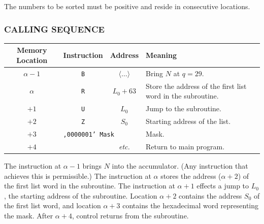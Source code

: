 The numbers to be sorted must be positive and reside in consecutive locations.

\subsubsection*{CALLING SEQUENCE}
\begin{table}[h!]
\centering
\begin{tabularx}{\textwidth}{cccX}
\toprule
\textbf{Memory Location} & \textbf{Instruction} & \textbf{Address} & \textbf{Meaning} \\
\midrule
$\alpha - 1$ & \texttt{B} & $\langle \dots \rangle$ & Bring $N$ at $q=29$. \\
$\alpha$     & \texttt{R} & $L_0 + 63$              & Store the address of the first list word in the subroutine. \\
$+1$         & \texttt{U} & $L_0$                   & Jump to the subroutine. \\
$+2$         & \texttt{Z} & $S_0$                   & Starting address of the list. \\
$+3$         & \multicolumn{2}{l}{\texttt{,0000001' Mask}} & Mask. \\
$+4$         &            & \textit{etc.}           & Return to main program. \\
\bottomrule
\end{tabularx}
\end{table}

The instruction at $\alpha-1$ brings $N$ into the accumulator. (Any instruction that achieves this is permissible.) The instruction at $\alpha$ stores the address ($\alpha+2$) of the first list word in the subroutine. The instruction at $\alpha+1$ effects a jump to $L_0$, the starting address of the subroutine. Location $\alpha+2$ contains the address $S_0$ of the first list word, and location $\alpha+3$ contains the hexadecimal word representing the mask. After $\alpha+4$, control returns from the subroutine.

